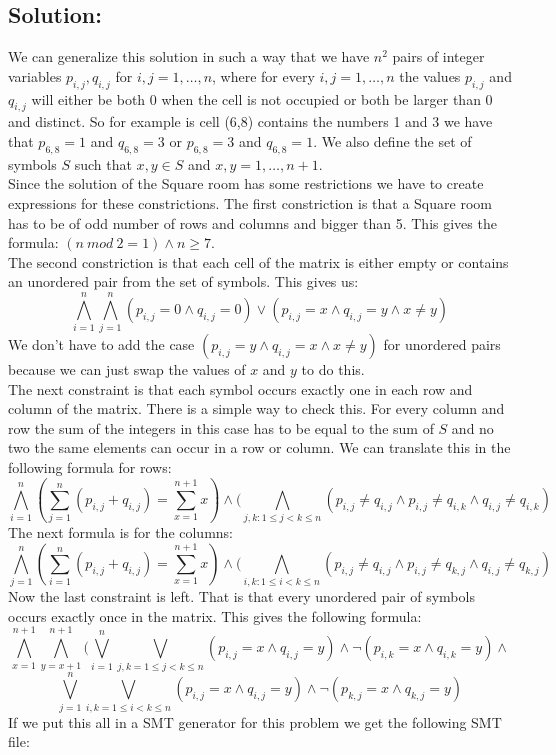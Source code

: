 \documentclass[12pt]{article}
\begin{document}
{\subsection*{Solution:}
We can generalize this solution in such a way that we have $n^2$ pairs of integer variables $p_{i,j}, q_{i,j}$ for $i,j = 1, \ldots, n$, where for every $i,j = 1, \ldots, n$ the values $p_{i,j}$ and $q_{i,j}$ will either be both 0 when the cell is not occupied or both be larger than 0 and distinct. So for example is cell (6,8) contains the numbers 1 and 3 we have that $p_{6,8} = 1$ and  $q_{6,8} = 3$ or  $p_{6,8} = 3$ and  $q_{6,8} = 1$. We also define the set of symbols $S$ such that $x,y \in S$ and $x,y = 1, \ldots, n+1$.\\
Since the solution of the Square room has some restrictions we have to create expressions for these constrictions. The first constriction is that a Square room has to be of odd number of rows and columns and bigger than 5. This gives the formula: $(n \ mod \ 2 = 1) \wedge n \geq 7$.\\
The second constriction is that each cell of the matrix is either empty or contains an unordered pair from the set of symbols. This gives us:
\[\bigwedge_{i=1}^{n} \bigwedge_{j=1}^{n} (p_{i,j} = 0 \wedge q_{i,j} = 0) \vee (p_{i,j} = x \wedge q_{i,j} = y \wedge x \neq y)\]
We don't have to add the case $(p_{i,j} = y \wedge q_{i,j} = x \wedge x \neq y)$ for unordered pairs because we can just swap the values of $x$ and $y$ to do this.\\
The next constraint is that each symbol occurs exactly one in each row and column of the matrix. There is a simple way to check this. For every column and row the sum of the integers in this case has to be equal to the sum of $S$ and no two the same elements can occur in a row or column. We can translate this in the following formula for rows:
\[\bigwedge_{i=1}^{n} (\sum_{j=1}^{n} (p_{i,j} + q_{i,j}) = \sum_{x=1}^{n+1} x) \wedge (\bigwedge_{j,k: 1\leq j < k \leq n} (p_{i,j} \neq q_{i,j} \wedge p_{i,j} \neq q_{i,k} \wedge q_{i,j} \neq q_{i,k})\]
The next formula is for the columns:
\[\bigwedge_{j=1}^{n} (\sum_{i=1}^{n} (p_{i,j} + q_{i,j}) = \sum_{x=1}^{n+1} x) \wedge (\bigwedge_{i,k: 1\leq i < k \leq n} (p_{i,j} \neq q_{i,j} \wedge p_{i,j} \neq q_{k,j} \wedge q_{i,j} \neq q_{k,j})\]
Now the last constraint is left. That is that every unordered pair of symbols occurs exactly once in the matrix. This gives the following formula:
\[\bigwedge_{x=1}^{n+1} \bigwedge_{y=x+1}^{n+1} ( \bigvee_{i=1}^{n} \bigvee_{j,k = 1 \leq j < k \leq n} (p_{i,j} = x \wedge q_{i,j} = y) \wedge \neg (p_{i,k} = x \wedge q_{i,k} = y)  \wedge \]
\[ \bigvee_{j=1}^{n} \bigvee_{i,k = 1 \leq i < k \leq n} (p_{i,j} = x \wedge q_{i,j} = y) \wedge \neg (p_{k,j} = x \wedge q_{k,j} = y) \]
If we put this all in a SMT generator for this problem we get the following SMT file:

}
\end{document}
